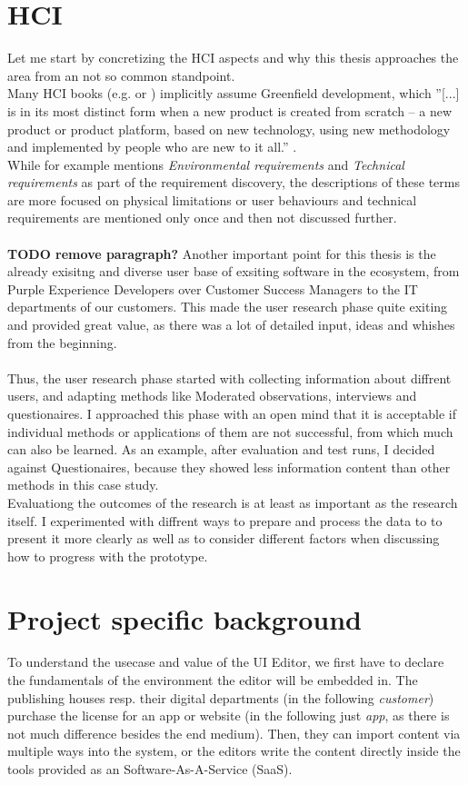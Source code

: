 \section{HCI}
Let me start by concretizing the HCI aspects and why this thesis approaches the area from an not so common standpoint.
\\
Many HCI books (e.g. \cite{Interactiondesign:2019ys} or \cite{LearnHCI:2020ys}) implicitly assume \label{def:Greenfield} Greenfield development,
which ''[...] is in its most distinct form when a new product is created from scratch – a new product or product platform, based on new technology, using new methodology and implemented by people who are new to it all.'' \cite{BrownfieldToGreenfield:2021ys}.
\\
While \cite[p. 392]{Interactiondesign:2019ys} for example mentions \textit{Environmental requirements} and \textit{Technical requirements} as part of the requirement discovery, the descriptions of these terms are more focused on physical limitations or user behaviours and technical requirements are mentioned only once and then not discussed further.
\\\\
\textbf{TODO remove paragraph?}
Another important point for this thesis is the already exisitng and diverse user base of exsiting software in the ecosystem, from Purple Experience Developers over Customer Success Managers to the IT departments of our customers. This made the user research phase quite exiting and provided great value, as there was a lot of detailed input, ideas and whishes from the beginning.
\\\\
Thus, the user research phase started with collecting information about diffrent users, and adapting methods like Moderated observations, interviews and questionaires. I approached this phase with an open mind that it is acceptable if individual methods or applications of them are not successful, from which much can also be learned. As an example, after evaluation and test runs, I decided against Questionaires, because they showed less information content than other methods in this case study.
\\
Evaluationg the outcomes of the research is at least as important as the research itself.
I experimented with diffrent ways to prepare and process the data to to present it more clearly as well as to consider different factors when discussing how to progress with the prototype.

\section{Project specific background}
To understand the usecase and value of the UI Editor, we first have to declare the fundamentals of the environment the editor will be embedded in.
The publishing houses resp. their digital departments (in the following \textit{customer}) purchase the license for an app or website (in the following just \textit{app}, as there is not much difference besides the end medium).
Then, they can import content via multiple ways into the system, or the editors write the content directly inside the tools provided as an Software-As-A-Service (SaaS).

